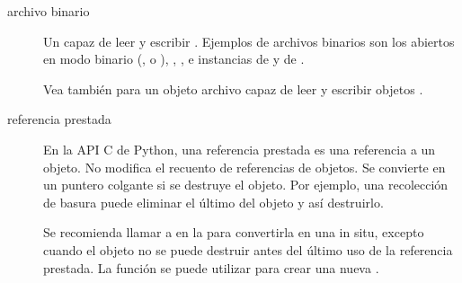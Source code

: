 \documentclass[a4,10pt,spanish]{sphinxmanual}
\begin{document}
\begin{description}
\item[{archivo binario\label{\detokenize{glossary:term-binary-file}}}] \leavevmode
\sphinxAtStartPar
Un {\hyperref[\detokenize{glossary:term-file-object}]{}} capaz de leer y escribir {\hyperref[\detokenize{glossary:term-bytes-like-object}]{}}. Ejemplos de archivos binarios son los abiertos en modo binario (,  o ), , , e instancias de  y de .

\sphinxAtStartPar
Vea también {\hyperref[\detokenize{glossary:term-text-file}]{}} para un objeto archivo capaz de leer y escribir objetos .

\item[{referencia prestada\label{\detokenize{glossary:term-borrowed-reference}}}] \leavevmode
\sphinxAtStartPar
En la API C de Python, una referencia prestada es una referencia a un objeto. No modifica el recuento de referencias de objetos. Se convierte en un puntero colgante si se destruye el objeto. Por ejemplo, una recolección de basura puede eliminar el último {\hyperref[\detokenize{glossary:term-strong-reference}]{}} del objeto y así destruirlo.

\sphinxAtStartPar
Se recomienda llamar a  en la {\hyperref[\detokenize{glossary:term-borrowed-reference}]{}} para convertirla en una {\hyperref[\detokenize{glossary:term-strong-reference}]{}} in situ, excepto cuando el objeto no se puede destruir antes del último uso de la referencia prestada. La función  se puede utilizar para crear una nueva {\hyperref[\detokenize{glossary:term-strong-reference}]{}}.


\end{description}
\end{document}

